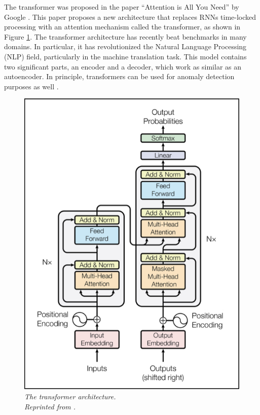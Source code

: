 The transformer was proposed in the paper ``Attention is All You Need'' by Google \cite{vaswani_shazeer_parmar_uszkoreit_jones_n_gomez_kaiser_polosukhin_2017}. This paper proposes a new architecture that replaces RNNs time-locked processing with an attention mechanism called the transformer, as shown in Figure \ref{fig:attention}. The transformer architecture has recently beat benchmarks in many domains. In particular, it has revolutionized the Natural Language Processing (NLP) field, particularly in the machine translation task. This model contains two significant parts, an encoder and a decoder, which work as similar as an autoencoder. In principle, transformers can be used for anomaly detection purposes as well \cite{mishra_verk_fornasier_piciarelli_foresti_2021}.

\begin{figure}[H]
  \centering
  \caption[The transformer architecture.]{\emph{The transformer architecture. \\Reprinted from \citeauthor{vaswani_shazeer_parmar_uszkoreit_jones_n_gomez_kaiser_polosukhin_2017} \citeyear{vaswani_shazeer_parmar_uszkoreit_jones_n_gomez_kaiser_polosukhin_2017}.}}\label{fig:attention}
  \includegraphics[scale = 0.4
  ]{figures/attention.jpg}
\end{figure}



